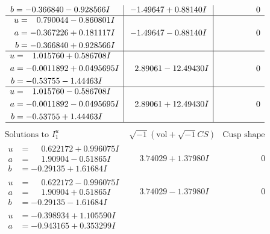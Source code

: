 \documentclass[1p]{elsarticle_modified}
\theoremstyle{definition}
\newcommand{\I}{\sqrt{-1}}
\begin{document}
$$\begin{array}{c|c|c}
\begin{aligned}
b &= -0.366840 - 0.928566 I\end{aligned}
 & -1.49647 + 0.88140 I & \phantom{-0.000000 } 0 \\ \hline\begin{aligned}
u &= \phantom{-}0.790044 - 0.860801 I \\
a &= -0.367226 + 0.181117 I \\
b &= -0.366840 + 0.928566 I\end{aligned}
 & -1.49647 - 0.88140 I & \phantom{-0.000000 } 0 \\ \hline\begin{aligned}
u &= \phantom{-}1.015760 + 0.586708 I \\
a &= -0.0011892 + 0.0495695 I \\
b &= -0.53755 - 1.44463 I\end{aligned}
 & \phantom{-}2.89061 - 12.49430 I & \phantom{-0.000000 } 0 \\ \hline\begin{aligned}
u &= \phantom{-}1.015760 - 0.586708 I \\
a &= -0.0011892 - 0.0495695 I \\
b &= -0.53755 + 1.44463 I\end{aligned}
 & \phantom{-}2.89061 + 12.49430 I & \phantom{-0.000000 } 0\\
 \hline 
 \end{array}$$\newpage$$\begin{array}{c|c|c}  
\text{Solutions to }I^u_{1}& \I (\text{vol} + \sqrt{-1}CS) & \text{Cusp shape}\\
 \hline 
\begin{aligned}
u &= \phantom{-}0.622172 + 0.996075 I \\
a &= \phantom{-}1.90904 - 0.51865 I \\
b &= -0.29135 + 1.61684 I\end{aligned}
 & \phantom{-}3.74029 + 1.37980 I & \phantom{-0.000000 } 0 \\ \hline\begin{aligned}
u &= \phantom{-}0.622172 - 0.996075 I \\
a &= \phantom{-}1.90904 + 0.51865 I \\
b &= -0.29135 - 1.61684 I\end{aligned}
 & \phantom{-}3.74029 - 1.37980 I & \phantom{-0.000000 } 0 \\ \hline\begin{aligned}
u &= -0.398934 + 1.105590 I \\
a &= -0.943165 + 0.353299 I \\

\end{aligned}
\end{array}$$
\end{document}
